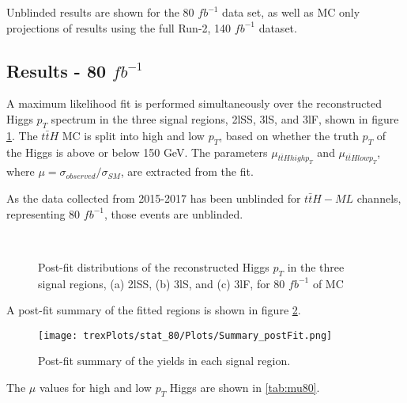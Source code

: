 Unblinded results are shown for the 80 $fb^{-1}$ data set, as well as MC only projections of results using the full Run-2, 140 $fb^{-1}$ dataset.

\subsection{Results - 80 $fb^{-1}$}
\label{sec:res80}

A maximum likelihood fit is performed simultaneously over the reconstructed Higgs $p_T$ spectrum in the three signal regions, 2lSS, 3lS, and 3lF, shown in figure \ref{fig:sigRegions80}. The $t\bar{t}H$ MC is split into high and low $p_T$, based on whether the truth $p_T$ of the Higgs is above or below 150 GeV. The parameters $\mu_{t\bar{t}H high p_T}$ and $\mu_{t\bar{t}H low p_T}$, where $\mu = \sigma_{observed}/\sigma_{SM} $, are extracted from the fit.

As the data collected from 2015-2017 has been unblinded for $t\bar{t}H-ML$ channels, representing 80 $fb^{-1}$, those events are unblinded.

\begin{figure}[h!]
    \\
    \caption{Post-fit distributions of the reconstructed Higgs $p_T$ in the three signal regions, (a) 2lSS, (b) 3lS, and (c) 3lF, for 80 $fb^{-1}$ of MC}
    \label{fig:sigRegions80}
\end{figure}

A post-fit summary of the fitted regions is shown in figure \ref{fig:Summary80}.

\begin{figure}[h!]
    \center
    \texttt{[image: trexPlots/stat\_80/Plots/Summary\_postFit.png]}
    \caption{Post-fit summary of the yields in each signal region.}                                            
    \label{fig:Summary80}
\end{figure}

The $\mu$ values for high and low $p_T$ Higgs are shown in \ref{tab:mu80}.


